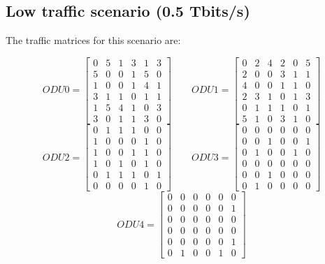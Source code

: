 \subsection{Low traffic scenario (0.5 Tbits/s)}\label{low_scenario}

The traffic matrices for this scenario are:

\[
ODU0=
  \begin{bmatrix}
    0 & 5 & 1 & 3 & 1 & 3 \\
    5 & 0 & 0 & 1 & 5 & 0 \\
    1 & 0 & 0 & 1 & 4 & 1 \\
    3 & 1 & 1 & 0 & 1 & 1 \\
    1 & 5 & 4 & 1 & 0 & 3 \\
    3 & 0 & 1 & 1 & 3 & 0
  \end{bmatrix}
\qquad ODU1=
  \begin{bmatrix}
    0 & 2 & 4 & 2 & 0 & 5 \\
    2 & 0 & 0 & 3 & 1 & 1 \\
    4 & 0 & 0 & 1 & 1 & 0 \\
    2 & 3 & 1 & 0 & 1 & 3 \\
    0 & 1 & 1 & 1 & 0 & 1 \\
    5 & 1 & 0 & 3 & 1 & 0
  \end{bmatrix}
\]
\[
ODU2=
  \begin{bmatrix}
    0 & 1 & 1 & 1 & 0 & 0 \\
    1 & 0 & 0 & 0 & 1 & 0 \\
    1 & 0 & 0 & 1 & 1 & 0 \\
    1 & 0 & 1 & 0 & 1 & 0 \\
    0 & 1 & 1 & 1 & 0 & 1 \\
    0 & 0 & 0 & 0 & 1 & 0
  \end{bmatrix}
\qquad ODU3=
  \begin{bmatrix}
    0 & 0 & 0 & 0 & 0 & 0 \\
    0 & 0 & 1 & 0 & 0 & 1 \\
    0 & 1 & 0 & 0 & 1 & 0 \\
    0 & 0 & 0 & 0 & 0 & 0 \\
    0 & 0 & 1 & 0 & 0 & 0 \\
    0 & 1 & 0 & 0 & 0 & 0
  \end{bmatrix}
\]
\[
ODU4=
  \begin{bmatrix}
    0 & 0 & 0 & 0 & 0 & 0 \\
    0 & 0 & 0 & 0 & 0 & 1 \\
    0 & 0 & 0 & 0 & 0 & 0 \\
    0 & 0 & 0 & 0 & 0 & 0 \\
    0 & 0 & 0 & 0 & 0 & 1 \\
    0 & 1 & 0 & 0 & 1 & 0
  \end{bmatrix}
\]

